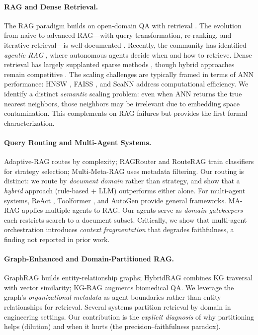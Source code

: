 \documentclass{article}
\begin{document}
\paragraph{RAG and Dense Retrieval.}
The RAG paradigm \cite{lewis2020rag} builds on open-domain QA with retrieval \cite{chen2017drqa, karpukhin2020dpr}. The evolution from naive to advanced RAG---with query transformation, re-ranking, and iterative retrieval---is well-documented \cite{gao2024ragsurvey, zhao2024ragsurvey2}. Recently, the community has identified \textit{agentic RAG} \cite{singh2025agenticrag}, where autonomous agents decide when and how to retrieve. Dense retrieval \cite{karpukhin2020dpr, xiong2021ance} has largely supplanted sparse methods \cite{robertson2009bm25}, though hybrid approaches remain competitive \cite{sawarkar2024blended}. The scaling challenges are typically framed in terms of ANN performance: HNSW \cite{malkov2020hnsw}, FAISS \cite{johnson2021faiss}, and ScaNN \cite{guo2020scann} address computational efficiency. We identify a distinct \textit{semantic} scaling problem: even when ANN returns the true nearest neighbors, those neighbors may be irrelevant due to embedding space contamination. This complements \citet{barnett2024seven} on RAG failures but provides the first formal characterization.

\paragraph{Query Routing and Multi-Agent Systems.}
Adaptive-RAG \cite{jeong2024adaptiverag} routes by complexity; RAGRouter \cite{zhang2025ragrouter} and RouteRAG \cite{guo2025routerag} train classifiers for strategy selection; Multi-Meta-RAG \cite{poliakov2024multimetarag} uses metadata filtering. Our routing is distinct: we route by \textit{document domain} rather than strategy, and show that a \textit{hybrid} approach (rule-based + LLM) outperforms either alone. For multi-agent systems, ReAct \cite{yao2023react}, Toolformer \cite{schick2023toolformer}, and AutoGen \cite{wu2023autogen} provide general frameworks. MA-RAG \cite{nguyen2025marag} applies multiple agents to RAG. Our agents serve as \textit{domain gatekeepers}---each restricts search to a document subset. Critically, we show that multi-agent orchestration introduces \textit{context fragmentation} that degrades faithfulness, a finding not reported in prior work.

\paragraph{Graph-Enhanced and Domain-Partitioned RAG.}
GraphRAG \cite{edge2024local} builds entity-relationship graphs; HybridRAG \cite{sarmah2024hybridrag} combines KG traversal with vector similarity; KG-RAG \cite{sanmartin2024kgrag} augments biomedical QA. We leverage the graph's \textit{organizational metadata} as agent boundaries rather than entity relationships for retrieval. Several systems partition retrieval by domain in engineering \cite{masoudifard2024leveraging} settings. Our contribution is the \textit{explicit diagnosis} of why partitioning helps (dilution) and when it hurts (the precision--faithfulness paradox).
\end{document}
